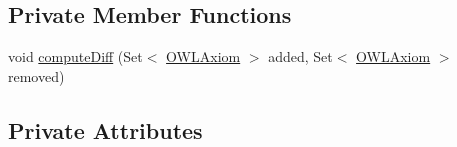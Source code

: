 \subsection*{Private Member Functions}
\begin{DoxyCompactItemize}
\item 
void \hyperlink{classorg_1_1semanticweb_1_1owlapi_1_1reasoner_1_1impl_1_1_o_w_l_reasoner_base_a28e275c64396f908ced182ae1888934c}{compute\-Diff} (Set$<$ \hyperlink{interfaceorg_1_1semanticweb_1_1owlapi_1_1model_1_1_o_w_l_axiom}{O\-W\-L\-Axiom} $>$ added, Set$<$ \hyperlink{interfaceorg_1_1semanticweb_1_1owlapi_1_1model_1_1_o_w_l_axiom}{O\-W\-L\-Axiom} $>$ removed)
\end{DoxyCompactItemize}
\subsection*{Private Attributes}
